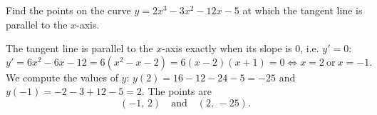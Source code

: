 
\begin{question}
Find the points on the curve $y=2x^3-3x^2-12x-5$ at which the tangent line is parallel to the $x$-axis.
\end{question}

\begin{solution}
The tangent line is parallel to the $x$-axis exactly when its slope is $0$, i.e. $y'=0$:
\[ y'=6x^2-6x-12=6(x^2-x-2)=6(x-2)(x+1)=0\iff x=2\ \text{or}\ x=-1. \]
We compute the values of $y$: $y(2)=16-12-24-5=-25$ and $y(-1)=-2-3+12-5=2$. The points are
\[ \boxed{(-1,\,2)\quad\text{and}\quad(2,\,-25)}. \]
\end{solution}
